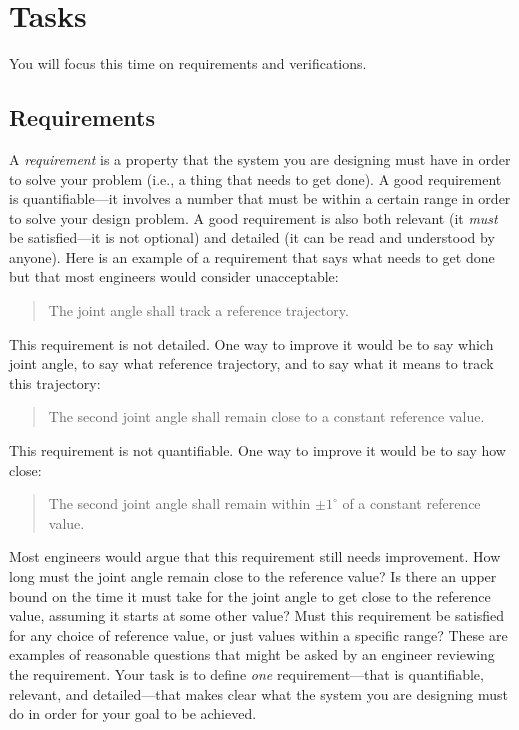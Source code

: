 \documentclass[12pt]{article}
\begin{document}
\section{Tasks}

You will focus this time on requirements and verifications.

\subsection{Requirements}
\label{secRequirements}

A {\em requirement} is a property that the system you are designing must have in order to solve your problem (i.e., a thing that needs to get done). A good requirement is quantifiable---it involves a number that must be within a certain range in order to solve your design problem. A good requirement is also both relevant (it {\em must} be satisfied---it is not optional) and detailed (it can be read and understood by anyone). Here is an example of a requirement that says what needs to get done but that most engineers would consider unacceptable:
\begin{quote}
The joint angle shall track a reference trajectory.
\end{quote}
This requirement is not detailed. One way to improve it would be to say which joint angle, to say what reference trajectory, and to say what it means to track this trajectory:
\begin{quote}
The second joint angle shall remain close to a constant reference value.
\end{quote}
This requirement is not quantifiable. One way to improve it would be to say how close:
\begin{quote}
The second joint angle shall remain within $\pm1^{\circ}$ of a constant reference value.
\end{quote}
Most engineers would argue that this requirement still needs improvement. How long must the joint angle remain close to the reference value? Is there an upper bound on the time it must take for the joint angle to get close to the reference value, assuming it starts at some other value? Must this requirement be satisfied for any choice of reference value, or just values within a specific range? These are examples of reasonable questions that might be asked by an engineer reviewing the requirement. Your task is to define {\em one} requirement---that is quantifiable, relevant, and detailed---that makes clear what the system you are designing must do in order for your goal to be achieved.
\end{document}
